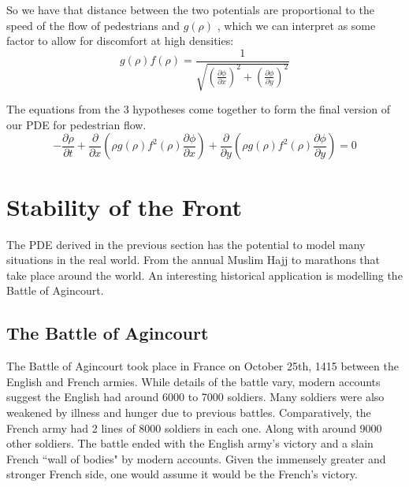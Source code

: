 \documentclass{article}
\begin{document}
\begin{enumerate}
    So we have that distance between the two potentials are proportional to the speed of the flow of pedestrians and $g(\rho)$ , which we can interpret as some factor to allow for discomfort at high densities:
    \begin{equation}
        g(\rho) f(\rho) = \frac{1}{ \sqrt{ \left(\frac{\partial \phi}{\partial x} \right)^2 + \left(\frac{\partial \phi}{\partial y} \right)^2 } }
    \end{equation}
    
    
    
    The equations from the 3 hypotheses come together to form the final version of our PDE for pedestrian flow.
    \begin{equation}
        -\frac{\partial \rho}{\partial t} + \frac{\partial}{\partial x} \left(\rho g(\rho) f^2 (\rho) \frac{\partial \phi}{\partial x} \right) + \frac{\partial}{\partial y} \left(\rho g(\rho) f^2 (\rho) \frac{\partial \phi}{\partial y} \right) = 0
    \end{equation}

    
    
    
    
\end{enumerate}

\section{Stability of the Front}
The PDE derived in the previous section has the potential to model many situations in the real world. From the annual Muslim Hajj to marathons that take place around the world. An interesting historical application is modelling the Battle of Agincourt.

\subsection{The Battle of Agincourt}
The Battle of Agincourt took place in France on October 25th, 1415 between the English and French armies. While details of the battle vary, modern accounts suggest the English had around 6000 to 7000 soldiers. Many soldiers were also weakened by illness and hunger due to previous battles. Comparatively, the French army had 2 lines of 8000 soldiers in each one. Along with around 9000 other soldiers. The battle ended with the English army's victory and a slain French ``wall of bodies" by modern accounts. Given the immensely greater and stronger French side, one would assume it would be the French's victory.
\end{document}

